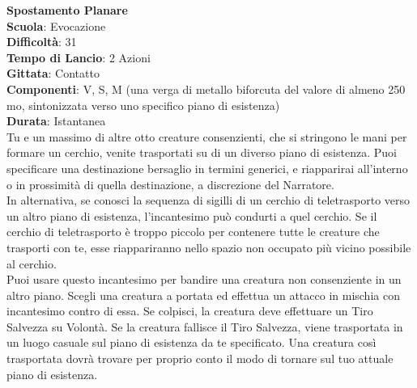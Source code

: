 \begin{multicols}{2}
\medskip\textbf{Spostamento Planare}\\
\textbf{Scuola}: Evocazione\\
\textbf{Difficoltà}: 31\\
\textbf{Tempo di Lancio}: 2 Azioni\\
\textbf{Gittata}: Contatto\\
\textbf{Componenti}: V, S, M (una verga di metallo biforcuta del valore di almeno 250 mo, sintonizzata verso uno specifico piano di esistenza)\\
\textbf{Durata}: Istantanea\\
Tu e un massimo di altre otto creature consenzienti, che si stringono le mani per formare un cerchio, venite trasportati su di un diverso piano di esistenza. Puoi specificare una destinazione bersaglio in termini generici, e riapparirai all'interno o in prossimità di quella destinazione, a discrezione del Narratore.\\
In alternativa, se conosci la sequenza di sigilli di un cerchio di teletrasporto verso un altro piano di esistenza, l'incantesimo può condurti a quel cerchio. Se il cerchio di teletrasporto è troppo piccolo per contenere tutte le creature che trasporti con te, esse riappariranno nello spazio non occupato più vicino possibile al cerchio.\\
Puoi usare questo incantesimo per bandire una creatura non consenziente in un altro piano. Scegli una creatura a portata ed effettua un attacco in mischia con incantesimo contro di essa. Se colpisci, la creatura deve effettuare un Tiro Salvezza su Volontà. Se la creatura fallisce il Tiro Salvezza, viene trasportata in un luogo casuale sul piano di esistenza da te specificato. Una creatura così trasportata dovrà trovare per proprio conto il modo di tornare sul tuo attuale piano di esistenza.


\end{multicols}
